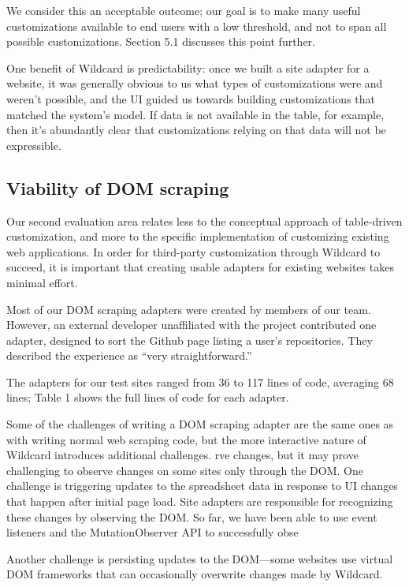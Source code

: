 \documentclass[sigplan,10pt,anonymous,review]{acmart}
\begin{document}
We consider this an acceptable outcome; our goal is to make many useful
customizations available to end users with a low threshold, and not to
span all possible customizations. Section 5.1 discusses this point
further.

One benefit of Wildcard is predictability: once we built a site adapter
for a website, it was generally obvious to us what types of
customizations were and weren't possible, and the UI guided us towards
building customizations that matched the system's model. If data is not
available in the table, for example, then it's abundantly clear that
customizations relying on that data will not be expressible.

\hypertarget{viability-of-dom-scraping}{%
\subsection{Viability of DOM scraping}\label{viability-of-dom-scraping}}

Our second evaluation area relates less to the conceptual approach of
table-driven customization, and more to the specific implementation of
customizing existing web applications. In order for third-party
customization through Wildcard to succeed, it is important that creating
usable adapters for existing websites takes minimal effort.

Most of our DOM scraping adapters were created by members of our team.
However, an external developer unaffiliated with the project contributed
one adapter, designed to sort the Github page listing a user's
repositories. They described the experience as ``very straightforward.''

The adapters for our test sites ranged from 36 to 117 lines of code,
averaging 68 lines; Table 1 shows the full lines of code for each
adapter.

Some of the challenges of writing a DOM scraping adapter are the same
ones as with writing normal web scraping code, but the more interactive
nature of Wildcard introduces additional challenges. rve changes, but it
may prove challenging to observe changes on some sites only through the
DOM. One challenge is triggering updates to the spreadsheet data in
response to UI changes that happen after initial page load. Site
adapters are responsible for recognizing these changes by observing the
DOM. So far, we have been able to use event listeners and the
MutationObserver API to successfully obse

Another challenge is persisting updates to the DOM---some websites use
virtual DOM frameworks that can occasionally overwrite changes made by
Wildcard.
\end{document}

